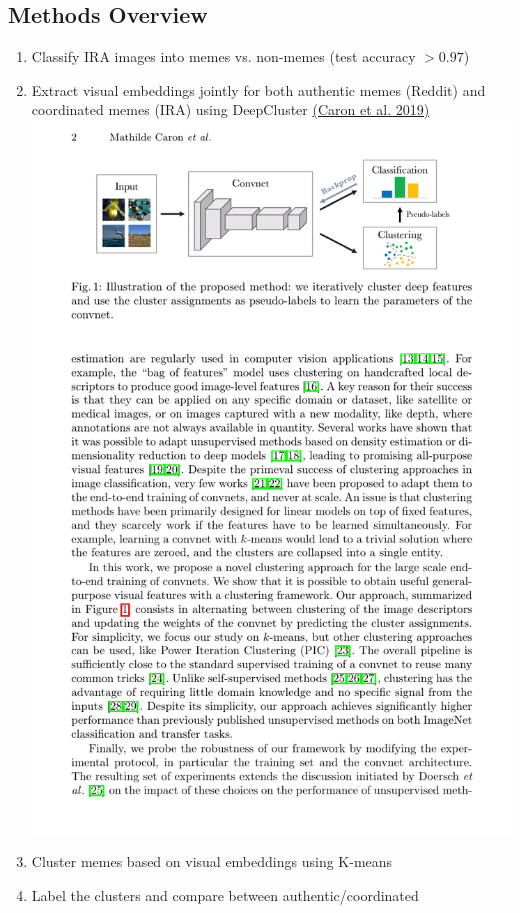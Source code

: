 \documentclass[article,36pt,extrafontsizes,oneside,openany,oldfontcommands]{memoir}
\begin{document}
\begin{adjmulticols*}{3}{0.5in}{0.5in}
\section{Methods Overview}
\begin{adjustwidth}{0.1in}{0in}
\begin{enumerate}[topsep=0pt,itemsep=0ex,partopsep=0ex,parsep=0ex]
\item Classify IRA images into memes vs. non-memes (test accuracy $>0.97$)
\item Extract visual embeddings jointly for both authentic memes (Reddit) and coordinated memes (IRA) using DeepCluster \href{http://arxiv.org/abs/1807.05520}{(Caron et al. 2019)}\\
{\centering \includegraphics[width=.8\linewidth]{figure/deep_cluster.pdf}}
\item Cluster memes based on visual embeddings using K-means 
\item Label the clusters and compare between authentic/coordinated
\end{enumerate} 
\end{adjustwidth}




\end{adjmulticols*}
\end{document}
